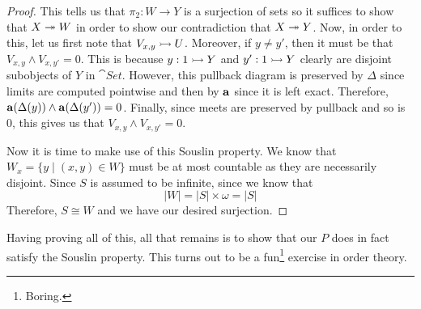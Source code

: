 \begin{proof}
  This tells us that $\pi_2 : W \to Y$ is a surjection of sets so it
  suffices to show that $X \twoheadrightarrow W$ in order to show our contradiction
  that $X \twoheadrightarrow Y$. Now, in order to this, let us first note that
  $V_{x, y} \rightarrowtail U$. Moreover, if $y \neq y'$, then it must be that
  $V_{x, y} \wedge V_{x, y'} = 0$. This is because $y : 1 \rightarrowtail Y$ and
  $y' : 1 \rightarrowtail Y$ clearly are disjoint subobjects of $Y$ in
  $\cat{Set}$. However, this pullback diagram is preserved by $\Delta$
  since limits are computed pointwise and then by $\mathbf{a}$ since it
  is left exact. Therefore,
  $\mathbf{a}(\Delta(y)) \wedge \mathbf{a}(\Delta(y')) = 0$. Finally,
  since meets are preserved by pullback and so is $0$, this gives us
  that $V_{x, y} \wedge V_{x, y'} = 0$.

  Now it is time to make use of this Souslin property. We know that
  $W_x = \{y \mid (x, y) \in W\}$ must be at most countable as they
  are necessarily disjoint. Since $S$ is assumed to be infinite, since
  we know that
  \[
    \left\vert W \right\vert = \left\vert S \right\vert \times \omega
    = \left\vert S \right\vert
  \]
  Therefore, $S \cong W$ and we have our desired surjection.
\end{proof}

Having proving all of this, all that remains is to show that our $P$
does in fact satisfy the Souslin property. This turns out to be a
fun\footnote{Boring.} exercise in order theory.

